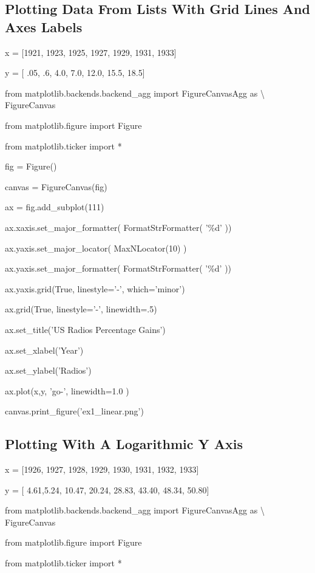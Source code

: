 \documentclass[12pt,oneside]{book}
\begin{document}
\subsection[Plotting Data From Lists With Grid Lines And Axes Labels]{ Plotting Data From Lists With Grid Lines And Axes Labels} 

x = [1921, 1923, 1925, 1927, 1929, 1931, 1933]

y = [ .05, .6, 4.0, 7.0, 12.0, 15.5, 18.5]


from matplotlib.backends.backend\_agg import FigureCanvasAgg as {\textbackslash} FigureCanvas

from matplotlib.figure import Figure

from matplotlib.ticker import *

fig = Figure()

canvas = FigureCanvas(fig)

ax = fig.add\_subplot(111)

ax.xaxis.set\_major\_formatter( FormatStrFormatter( '\%d' ))

ax.yaxis.set\_major\_locator( MaxNLocator(10) )

ax.yaxis.set\_major\_formatter( FormatStrFormatter(
'\%d' ))

ax.yaxis.grid(True, linestyle='{}-',
which='minor')

ax.grid(True, linestyle='{}-',
linewidth=.5)

ax.set\_title('US Radios Percentage
Gains')

ax.set\_xlabel('Year')

ax.set\_ylabel('Radios')

ax.plot(x,y, 'go{}-', linewidth=1.0 )

canvas.print\_figure('ex1\_linear.png')

{\textbar}


\subsection[Plotting With A Logarithmic Y Axis]{ Plotting With A Logarithmic Y Axis}

x = [1926, 1927, 1928, 1929, 1930, 1931, 1932, 1933]

y = [ 4.61,5.24, 10.47, 20.24, 28.83, 43.40, 48.34, 50.80]


from matplotlib.backends.backend\_agg import FigureCanvasAgg as
{\textbackslash} FigureCanvas

from matplotlib.figure import Figure

from matplotlib.ticker import *
\end{document}
